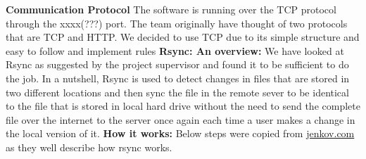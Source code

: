 \documentclass{article}
\begin{document}
\hfill \break
\textbf{Communication Protocol}
The software is running over the TCP protocol through the xxxx(???) port. The team originally have thought of two protocols that are TCP and HTTP. We decided to use TCP due to its simple structure and easy to follow and implement rules
\newline
\hfill \break
\textbf{Rsync: An overview:} We have looked at Rsync as suggested by the project supervisor and found it to be sufficient to do the job. In a nutshell, Rsync is used to detect changes in files that are stored in two different locations and then sync the file in the remote sever to be identical to the file that is stored in local hard drive without the need to send the complete file over the internet to the server once again each time a user makes a change in the local version of it.
\newline
\hfill \break
\textbf{How it works:}
Below steps were copied from \underline{jenkov.com} as they well describe how rsync works.
\end{document}
